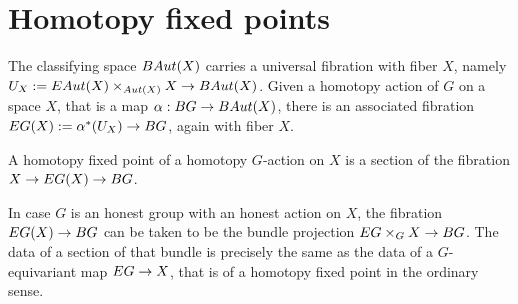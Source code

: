 \documentclass{amsart}
\begin{document}

\section{Homotopy fixed points}


The classifying space $BAut(X)$ carries a universal fibration with fiber $X$, namely $U_X := EAut(X) \times_{Aut(X)} X \rightarrow BAut(X)$.    Given a homotopy action of $G$ on a space $X$, that is a map $\alpha: BG \rightarrow BAut(X)$, there is an associated fibration $EG(X):=\alpha^\ast(U_X) \rightarrow BG$, again with fiber $X$.

\begin{definition}
A homotopy fixed point of a homotopy $G$-action on $X$ is a section of the fibration $X \rightarrow EG(X) \rightarrow BG$.
\end{definition}

\begin{remark}
In case $G$ is an honest group with an honest action on $X$, the fibration $EG(X) \rightarrow BG$ can be taken to be the bundle projection $EG \times_G X \rightarrow BG$.  The data of a section of that bundle is precisely the same as the data of a $G$-equivariant map $EG \rightarrow X$, that is of a homotopy fixed point in the ordinary sense.
\end{remark}
\end{document}
